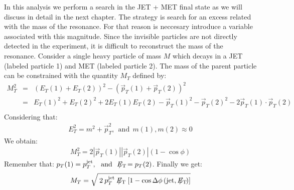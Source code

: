 In this analysis we perform a search in the JET + MET final state as we will discuss in detail in the next chapter. The strategy is search for an excess related with the mass of the resonance. For that reason is neccesary introduce a variable associated with this magnitude. Since the invisible particles are not directly detected in the experiment, it is difficult to reconstruct the mass of the resonance. Consider a single heavy particle of mass $M$ which decays in a JET (labeled particle 1) and MET (labeled particle 2). The mass of the parent particle can be constrained with the quantity $M_{T}$ defined by:
\begin{eqnarray}
M_{T}^{2} &=& (E_{T}(1)+E_{T}(2))^{2}  - (\vec{p}_{T}(1)+\vec{p}_{T}(2))^{2}\nonumber\\
&=& E_{T}(1)^{2} + E_{T}(2)^{2} +2 E_{T}(1)E_{T}(2) -\vec{p}_{T}(1)^{2} - \vec{p}_{T}(2)^{2} -2\vec{p}_{T}(1)\cdot \vec{p}_{T}(2)\nonumber\\
\end{eqnarray}
Considering that:
\begin{eqnarray}
E_{T}^{2} = m^{2}+\vec{p}_{T}^{2},\ \   \text{and}\ \  m(1),m(2) \approx 0
\end{eqnarray}
We obtain:
\begin{eqnarray}
M_{T}^{2} = 2 \left| \vec{p}_{T}(1)\right| \left| \vec{p}_{T}(2)\right| \left(1-\cos\phi \right) 
\end{eqnarray}
Remember that: $p_{T}(1)=p_{T}^{\text{jet}},\ \   \text{and}\ \  \met=p_{T}(2)$.
Finally we get:
\begin{eqnarray}
M_{T} = \sqrt{\:2\: p_{T}^{\text{jet}}\: \met\: \left[ 1-\cos\Delta\phi\left( \text{jet}, \met\right)  \right] } 
\end{eqnarray}



